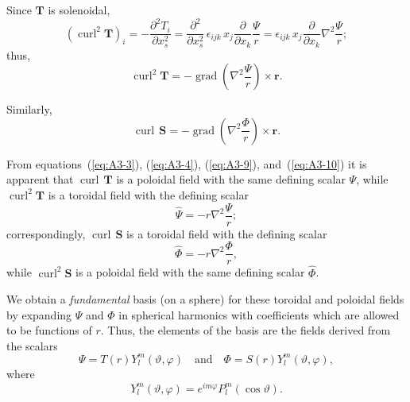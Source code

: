 Since $\mathbf{T}$ is solenoidal,
\begin{equation}
\label{eq:A3-8}
(\operatorname{curl}^2\mathbf{T})_i = -\frac{\partial^2 T_i}{\partial x_s^2} = \frac{\partial^2}{\partial x_s^2}\,\epsilon_{ijk}\,x_j\frac{\partial}{\partial x_k}\frac{\Psi}{r} = \epsilon_{ijk}\,x_j\frac{\partial}{\partial x_k}\nabla^2\frac{\Psi}{r};
\end{equation}
thus,
\begin{equation}
\label{eq:A3-9}
\operatorname{curl}^2\mathbf{T} = -\operatorname{grad}\!\left(\nabla^2\frac{\Psi}{r}\right) \times \mathbf{r}.
\end{equation}

Similarly,
\begin{equation}
\label{eq:A3-10}
\operatorname{curl}\,\mathbf{S} = -\operatorname{grad}\!\left(\nabla^2\frac{\Phi}{r}\right) \times \mathbf{r}.
\end{equation}

From equations~(\ref{eq:A3-3}), (\ref{eq:A3-4}), (\ref{eq:A3-9}), and~(\ref{eq:A3-10}) it is apparent that $\operatorname{curl}\,\mathbf{T}$ is a poloidal field with the same defining scalar $\Psi$, while $\operatorname{curl}^2\mathbf{T}$ is a toroidal field with the defining scalar
\begin{equation}
\label{eq:A3-11}
\hat{\Psi} = -r\nabla^2\frac{\Psi}{r};
\end{equation}
correspondingly, $\operatorname{curl}\,\mathbf{S}$ is a toroidal field with the defining scalar
\begin{equation}
\label{eq:A3-12}
\hat{\Phi} = -r\nabla^2\frac{\Phi}{r},
\end{equation}
while $\operatorname{curl}^2\mathbf{S}$ is a poloidal field with the same defining scalar $\hat{\Phi}$.

We obtain a \emph{fundamental} basis (on a sphere) for these toroidal and poloidal fields by expanding $\Psi$ and $\Phi$ in spherical harmonics with coefficients which are allowed to be functions of $r$. Thus, the elements of the basis are the fields derived from the scalars
\begin{equation}
\label{eq:A3-13}
\Psi = T(r) Y_l^m(\vartheta, \varphi) \quad \text{and} \quad \Phi = S(r) Y_l^m(\vartheta, \varphi),
\end{equation}
where
\begin{equation}
\label{eq:A3-14}
Y_l^m(\vartheta, \varphi) = e^{im\varphi} P_l^m(\cos\vartheta).
\end{equation}

